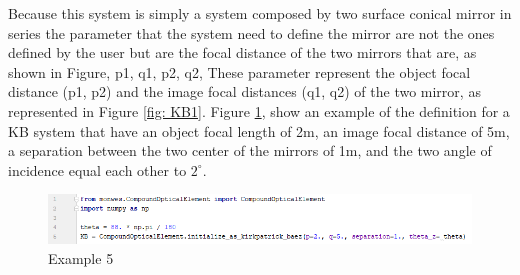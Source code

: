 %
Because this system is simply a system composed by two surface conical mirror in series the parameter that the system need to define the mirror are not the ones defined by the user but are the focal distance of the two mirrors that are, as shown in Figure, p1, q1, p2, q2, These parameter represent the object focal distance (p1, p2) and the image focal distances (q1, q2) of the two mirror, as represented in Figure \ref{fig: KB1}. Figure \ref{fig: CodeKB}, show an example of the definition for a KB system that have an object focal length of 2m, an image focal distance of 5m, a separation between the two center of the mirrors of 1m, and the two angle of incidence equal each other to $2^{\circ} $.
\begin{figure}[H]
%
\centering
%
\includegraphics[width=1.\textwidth]{Immagini/Chapter3/CodeKB}
%
\caption{Example 5}
%
\label{fig: CodeKB}
%
\end{figure}
